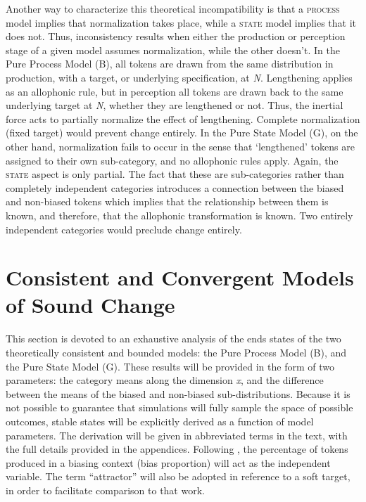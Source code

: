 Another way to characterize this theoretical incompatibility is that
a \textsc{process} model implies that normalization takes place, while
a \textsc{state} model implies that it does not. Thus, inconsistency
results when either the production or perception stage of a given
model assumes normalization, while the other doesn't. In the Pure
Process Model (B), all tokens are drawn from the same distribution
in production, with a target, or underlying specification, at \emph{N}.
Lengthening applies as an allophonic rule, but in perception all tokens
are drawn back to the same underlying target at \emph{N}, whether
they are lengthened or not. Thus, the inertial force acts to partially
normalize the effect of lengthening. Complete normalization (fixed
target) would prevent change entirely. In the Pure State Model (G),
on the other hand, normalization fails to occur in the sense that
`lengthened' tokens are assigned to their own sub-category, and no
allophonic rules apply. Again, the \textsc{state} aspect is only partial.
The fact that these are sub-categories rather than completely independent
categories introduces a connection between the biased and non-biased
tokens which implies that the relationship between them is known,
and therefore, that the allophonic transformation is known. Two entirely
independent categories would preclude change entirely. 

\section{\label{sec:Model-Behavior}Consistent and Convergent Models of Sound
Change}

This section is devoted to an exhaustive analysis of the ends states
of the two theoretically consistent and bounded models: the Pure Process
Model (B), and the Pure State Model (G). These results will be provided
in the form of two parameters: the category means along the dimension
\emph{x}, and the difference between the means of the biased and non-biased
sub-distributions. Because it is not possible to guarantee that simulations
will fully sample the space of possible outcomes, stable states will
be explicitly derived as a function of model parameters. The derivation
will be given in abbreviated terms in the text, with the full details
provided in the appendices. Following \citet{soskuthy2013phonetic,Soskuthy2015},
the percentage of tokens produced in a biasing context (bias proportion)
will act as the independent variable. The term “attractor” will
also be adopted in reference to a soft target, in order to facilitate
comparison to that work. 

